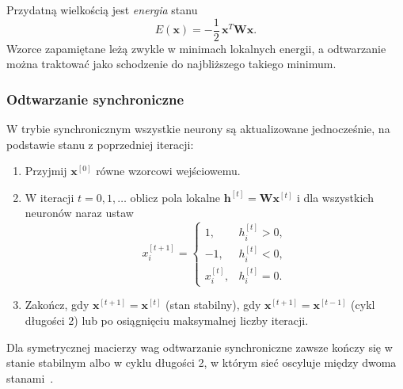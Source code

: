 \documentclass{article}
\begin{document}
Przydatną wielkością jest \emph{energia} stanu
\[
  E(\mathbf{x}) = -\frac{1}{2}\, \mathbf{x}^{T}\mathbf{W}\mathbf{x}.
\]
Wzorce zapamiętane leżą zwykle w minimach lokalnych energii, a odtwarzanie można traktować jako schodzenie do najbliższego takiego minimum.

\subsubsection{Odtwarzanie synchroniczne}
\label{sec:sync}
W trybie synchronicznym wszystkie neurony są aktualizowane jednocześnie, na podstawie stanu z poprzedniej iteracji:
\begin{enumerate}
  \item Przyjmij $\mathbf{x}^{[0]}$ równe wzorcowi wejściowemu.
  \item W iteracji $t = 0, 1, \ldots$ oblicz pola lokalne $\mathbf{h}^{[t]} = \mathbf{W}\mathbf{x}^{[t]}$
        i dla wszystkich neuronów naraz ustaw
        \[
          x_i^{[t+1]} =
          \begin{cases}
            1,         & h_i^{[t]} > 0, \\
            -1,        & h_i^{[t]} < 0, \\
            x_i^{[t]}, & h_i^{[t]} = 0.
          \end{cases}
        \]
  \item Zakończ, gdy $\mathbf{x}^{[t+1]} = \mathbf{x}^{[t]}$ (stan stabilny),
        gdy $\mathbf{x}^{[t+1]} = \mathbf{x}^{[t-1]}$ (cykl długości 2)
        lub po osiągnięciu maksymalnej liczby iteracji.
\end{enumerate}
Dla symetrycznej macierzy wag odtwarzanie synchroniczne zawsze kończy się w stanie stabilnym
albo w cyklu długości 2, w którym sieć oscyluje między dwoma stanami~\cite{bruck1990}.
\end{document}
